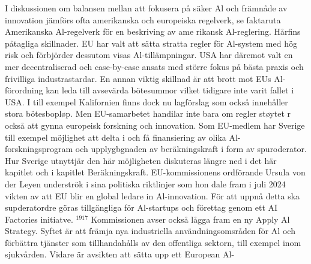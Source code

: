 {{{{{{{{{{{{{{{I diskussionen om balansen mellan att fokusera på säker Al och främnåde av innovation jämförs ofta amerikanska och europeiska regelverk, se faktaruta Amerikanska Al-regelverk för en beskriving av ame rikansk Al-reglering. Hårfins påtagliga skillnader. EU har valt att sätta stratta regler för Al-system med hög risk och förbjörder dessutom visas Al-tillämpningar. USA har däremot valt en mer decentraliserad och case-by-case ansats med större fokus på bästa praxis och frivilliga industrastardar. En annan viktig skillnad är att brott mot EUs Al-förordning kan leda till avsevärda bötesummor vilket tidigare inte varit fallet i USA. I till exempel Kalifornien finns dock nu lagförslag som också innehåller stora bötesbopløp.
Men EU-samarbetet handilar inte bara om regler støytet r också att gynna europeisk forskning och innovation. Som EU-medlem har Sverige till exempel möjlighet att delta i och få finansiering av olika Al-forskningsprogram och upplygbgnaden av beräkningskraft i form av spuroderator. Hur Sverige utnyttjär den här möjligheten diskuteras längre ned i det här kapitlet och i kapitlet Beräkningskraft.
EU-kommissionens ordförande Ursula von der Leyen underströk i sina politiska riktlinjer som hon dale fram i juli 2024 vikten av att EU blir en global ledare in Al-innovation. För att uppnå detta ska supderatordre göras tillgängliga för Al-startups och förettag genom ett AI Factories initiatve. \({ }^{1917}\) Kommissionen avser också lågga fram en ny Apply Al Strategy. Syftet är att främja nya industriella användningsomsråden för Al och förbättra tjänster som tillhandahålls av den offentliga sektorn, till exempel inom sjukvården. Vidare är avsikten att sätta upp ett European Al-

}}}}}}}}}}}}}}}
